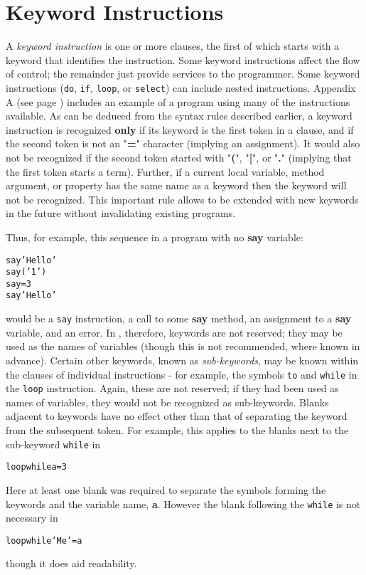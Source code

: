 \chapter{Keyword Instructions}\label{refkinst}
 A \emph{keyword instruction} is one or more clauses, the first of
which starts with a keyword that identifies the instruction.
Some keyword instructions affect the flow of control; the remainder
just provide services to the programmer.
Some keyword instructions (\texttt{do}, \texttt{if}, \texttt{loop}, or
\texttt{select}) can include nested instructions.
 Appendix A (see page \pageref{refappa})  includes an example of a \nr{} program
using many of the instructions available.
 As can be deduced from the syntax rules described earlier, a keyword
instruction is recognized \textbf{only} if its keyword is the first
token in a clause, and if the second token is not an "\textbf{=}"
character (implying an assignment).
It would also not be recognized if the second token started
with "\textbf{(}", "\textbf{[}",
or "\textbf{.}" (implying that the first token starts a term).
 Further, if a current local variable, method argument, or property
has the same name as a keyword then the keyword will not be recognized.
This important rule allows \nr{} to be extended with new keywords in
the future without invalidating existing programs.
 
Thus, for example, this sequence in a program with no \textbf{say}
variable:
\begin{alltt}
say 'Hello'
say('1')
say=3
say 'Hello'
\end{alltt}
would be a \texttt{say} instruction, a call to some \textbf{say}
method, an assignment to a \textbf{say} variable, and an error.
 In \nr{}, therefore, keywords are not reserved; they may be used as
the names of variables (though this is not recommended, where known in
advance).
 Certain other keywords, known as \emph{sub-keywords}, may be
known within the clauses of individual instructions - for
example, the symbols \texttt{to} and \texttt{while} in the \texttt{loop}
instruction.  Again, these are not reserved; if they had been used as
names of variables, they would not be recognized as sub-keywords.
 Blanks adjacent to keywords have no effect other than that of
separating the keyword from the subsequent token.
For example, this applies to the blanks next to the sub-keyword
\texttt{while} in
\begin{alltt}
loop  while  a=3
\end{alltt}
Here at least one blank was required to separate the symbols
forming the keywords and the variable name, \textbf{a}.  However the
blank following the \texttt{while} is not necessary in
\begin{alltt}
loop while 'Me'=a
\end{alltt}
though it does aid readability.
